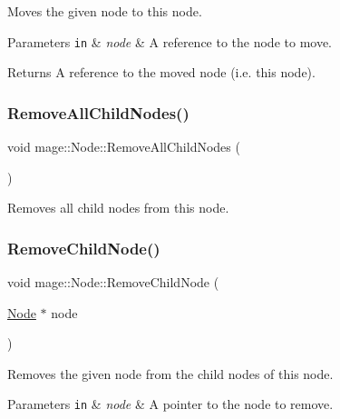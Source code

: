 Moves the given node to this node.


\begin{DoxyParams}[1]{Parameters}
\mbox{\tt in}  & {\em node} & A reference to the node to move. \\
\hline
\end{DoxyParams}
\begin{DoxyReturn}{Returns}
A reference to the moved node (i.\+e. this node). 
\end{DoxyReturn}
\hypertarget{classmage_1_1_node_a7627e4e280fc9dd13d255c0f64eba79e}{}\label{classmage_1_1_node_a7627e4e280fc9dd13d255c0f64eba79e} 
\subsubsection{\texorpdfstring{Remove\+All\+Child\+Nodes()}{RemoveAllChildNodes()}}
{\footnotesize\ttfamily void mage\+::\+Node\+::\+Remove\+All\+Child\+Nodes (\begin{DoxyParamCaption}{ }\end{DoxyParamCaption})\hspace{0.3cm}{\ttfamily [noexcept]}}

Removes all child nodes from this node. \hypertarget{classmage_1_1_node_a3d94c7b67a5c35366a6915f0fc816802}{}\label{classmage_1_1_node_a3d94c7b67a5c35366a6915f0fc816802} 
\subsubsection{\texorpdfstring{Remove\+Child\+Node()}{RemoveChildNode()}}
{\footnotesize\ttfamily void mage\+::\+Node\+::\+Remove\+Child\+Node (\begin{DoxyParamCaption}\item[{\hyperlink{classmage_1_1_node}{Node} $\ast$}]{node }\end{DoxyParamCaption})}

Removes the given node from the child nodes of this node.


\begin{DoxyParams}[1]{Parameters}
\mbox{\tt in}  & {\em node} & A pointer to the node to remove. \\
\hline
\end{DoxyParams}
\hypertarget{classmage_1_1_node_af123050daa89e50f5468b630061aae53}{}\label{classmage_1_1_node_af123050daa89e50f5468b630061aae53} 
